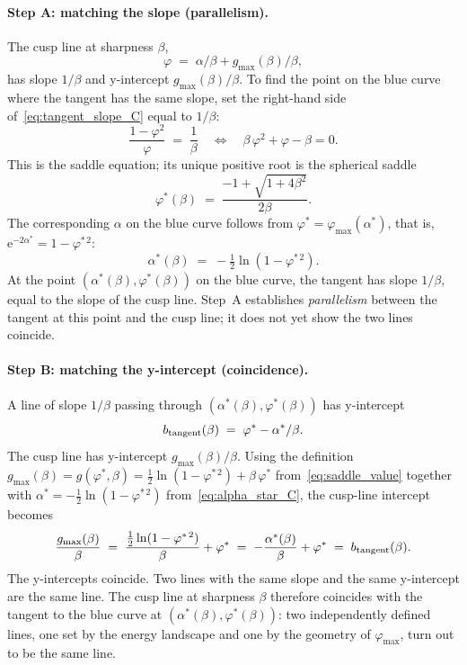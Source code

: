 \documentclass[letterpaper]{article} %
\newcommand{\e}{{\mathrm{e}}}
\newcommand{\Bnet}{\beta}
\begin{document}
\paragraph{Step A: matching the slope (parallelism).}
The cusp line at sharpness $\Bnet$,
\begin{equation}
\varphi \;=\; \alpha/\Bnet + g_{\max}(\Bnet)/\Bnet,
\end{equation}
has slope $1/\Bnet$ and y-intercept $g_{\max}(\Bnet)/\Bnet$. To find the point on
the blue curve where the tangent has the same slope, set the right-hand side
of~\eqref{eq:tangent_slope_C} equal to $1/\Bnet$:
\begin{equation}
\frac{1-\varphi^2}{\varphi} \;=\; \frac{1}{\Bnet}
\quad\Longleftrightarrow\quad
\Bnet\,\varphi^2 + \varphi - \Bnet = 0.
\label{eq:saddle_eq_C}
\end{equation}
This is the saddle equation; its unique positive root is the spherical saddle
\begin{equation}
\varphi^*(\Bnet) \;=\; \frac{-1 + \sqrt{1+4\Bnet^2}}{2\Bnet}.
\end{equation}
The corresponding $\alpha$ on the blue curve follows from
$\varphi^* = \varphi_{\max}(\alpha^*)$, that is, $\e^{-2\alpha^*} = 1 - \varphi^{*\,2}$:
\begin{equation}
\alpha^*(\Bnet) \;=\; -\tfrac12 \ln(1-\varphi^{*\,2}).
\label{eq:alpha_star_C}
\end{equation}
At the point $(\alpha^*(\Bnet), \varphi^*(\Bnet))$ on the blue curve, the tangent
has slope $1/\Bnet$, equal to the slope of the cusp line. Step~A establishes
\textit{parallelism} between the tangent at this point and the cusp line; it does
not yet show the two lines coincide.

\paragraph{Step B: matching the y-intercept (coincidence).}
A line of slope $1/\Bnet$ passing through $(\alpha^*(\Bnet), \varphi^*(\Bnet))$ has
y-intercept
\begin{equation}
b_{\rm tangent}(\Bnet) \;=\; \varphi^* - \alpha^*/\Bnet.
\end{equation}
The cusp line has y-intercept $g_{\max}(\Bnet)/\Bnet$. Using the definition
$g_{\max}(\Bnet) = g(\varphi^*, \Bnet) = \tfrac12 \ln(1-\varphi^{*\,2}) + \Bnet\,\varphi^*$
from~\eqref{eq:saddle_value} together with $\alpha^* = -\tfrac12 \ln(1-\varphi^{*\,2})$
from~\eqref{eq:alpha_star_C}, the cusp-line intercept becomes
\begin{equation}
\frac{g_{\max}(\Bnet)}{\Bnet}
\;=\; \frac{\tfrac12 \ln(1-\varphi^{*\,2})}{\Bnet} + \varphi^*
\;=\; -\frac{\alpha^*(\Bnet)}{\Bnet} + \varphi^*
\;=\; b_{\rm tangent}(\Bnet).
\label{eq:intercept_match_C}
\end{equation}
The y-intercepts coincide. Two lines with the same slope and the same y-intercept
are the same line. The cusp line at sharpness $\Bnet$ therefore coincides with
the tangent to the blue curve at $(\alpha^*(\Bnet), \varphi^*(\Bnet))$: two
independently defined lines, one set by the energy landscape and one by the
geometry of $\varphi_{\max}$, turn out to be the same line.
\end{document}
